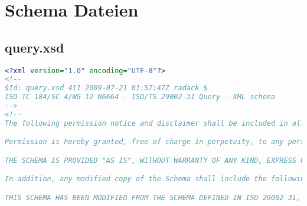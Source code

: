 
\chapter{Schema Dateien} \label{kap:anhang_schema}

\section{query.xsd}

 \begin{lstlisting}[caption=query.xsd, language=XML, label=lst:query_xsd]
<?xml version="1.0" encoding="UTF-8"?>
<!--
$Id: query.xsd 411 2009-07-21 01:57:47Z radack $
ISO TC 184/SC 4/WG 12 N6664 - ISO/TS 29002-31 Query - XML schema
-->
<!--
The following permission notice and disclaimer shall be included in all copies of this XML schema ("the Schema"), and derivations of the Schema:

Permission is hereby granted, free of charge in perpetuity, to any person obtaining a copy of the Schema, to use, copy, modify, merge and distribute free of charge, copies of the Schema for the purposes of developing, implementing, installing and using software based on the  Schema, and to permit persons to whom the Schema is furnished to do so, subject to the following conditions:

THE SCHEMA IS PROVIDED "AS IS", WITHOUT WARRANTY OF ANY KIND, EXPRESS OR IMPLIED, INCLUDING BUT NOT LIMITED TO THE WARRANTIES OF MERCHANTABILITY, FITNESS FOR A PARTICULAR PURPOSE AND NONINFRINGEMENT. IN NO EVENT SHALL THE AUTHORS OR COPYRIGHT HOLDERS BE LIABLE FOR ANY CLAIM, DAMAGES OR OTHER LIABILITY, WHETHER IN AN ACTION OF CONTRACT, TORT OR OTHERWISE, ARISING FROM, OUT OF OR IN CONNECTION WITH THE SCHEMA OR THE USE OR OTHER DEALINGS IN THE SCHEMA.

In addition, any modified copy of the Schema shall include the following notice:

THIS SCHEMA HAS BEEN MODIFIED FROM THE SCHEMA DEFINED IN ISO 29002-31, AND SHOULD NOT BE INTERPRETED AS COMPLYING WITH THAT STANDARD.


\end{lstlisting}
